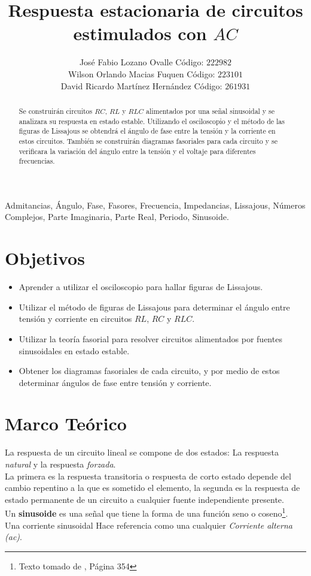 \documentclass[twocolumn]{IEEEtran}
\begin{document}
\title{Respuesta estacionaria de circuitos estimulados con $AC$}
\author{José Fabio Lozano Ovalle Código: $222982$\\
	Wilson Orlando Macias Fuquen Código: $223101$\\
	David Ricardo Martínez Hernández Código: $261931$}
\maketitle
{}

\begin{abstract}
Se construirán circuitos $RC$, $RL$ y $RLC$ alimentados por una señal sinusoidal y se analizara su respuesta en estado estable. Utilizando el osciloscopio y el método de las figuras de Lissajous se obtendrá  el ángulo de fase entre la tensión y la corriente en estos circuitos. También se construirán diagramas fasoriales para cada circuito y se verificara la variación del ángulo entre la tensión y el voltaje para diferentes frecuencias.
\end{abstract}

\begin{keywords}
Admitancias, Ángulo, Fase, Fasores, Frecuencia, Impedancias, Lissajous, Números Complejos, Parte Imaginaria, Parte Real, Periodo, Sinusoide.
\end{keywords}

\section{Objetivos}
\begin{itemize}
 \item Aprender a utilizar el osciloscopio para hallar figuras de Lissajous.
 \item Utilizar el método de figuras de Lissajous para determinar el ángulo entre tensión y corriente en circuitos $RL$, $RC$ y $RLC$.
 \item Utilizar la teoría fasorial para resolver circuitos alimentados por fuentes sinusoidales en estado estable.
 \item Obtener los diagramas fasoriales de cada circuito, y por medio de estos determinar ángulos de fase entre tensión y corriente.
\end{itemize}

\section{Marco Teórico}
\noindent
La respuesta de un circuito lineal se compone  de dos estados: La respuesta \textit{natural} y la respuesta \textit{forzada}.\\
La primera es la respuesta transitoria o respuesta de corto estado depende del cambio repentino a la que es sometido el elemento, la segunda es la respuesta de estado permanente de un circuito a cualquier fuente independiente presente.\\
Un \textbf{sinusoide} es una señal que tiene la forma de una función seno o coseno\footnote{Texto tomado de \cite{sadiku}, Página 354}.\\
Una corriente sinusoidal Hace referencia como una cualquier \textit{Corriente alterna (ac)}.
\end{document}
